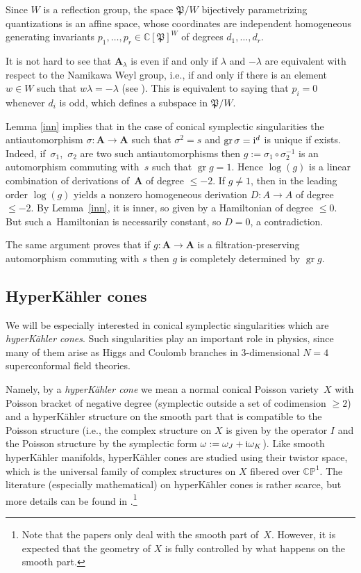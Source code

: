 \documentclass[pdftex]{sigma}
\numberwithin{equation}{section}
\begin{document}
Since $W$ is a reflection group, the space $\mathfrak{P}/W$ bijectively parametrizing quantizations is an affine space, whose coordinates are independent homogeneous generating invariants $p_1,\dots,p_r\in {\mathbb C}[\mathfrak{P}]^W$ of degrees $d_1,\dots,d_r$.

It is not hard to see that ${\mathbf A}_\lambda$ is even if and only if $\lambda$ and $-\lambda$ are equivalent with respect to the Namikawa Weyl group, i.e., if and only if there is an element $w\in W$ such that $w\lambda=-\lambda$ (see \cite{BPR}). This is equivalent to saying that $p_i=0$ whenever $d_i$ is odd, which defines a subspace in
$\mathfrak{P}/W$.

\begin{Remark}Lemma \ref{inn} implies that in the case of conical symplectic singularities the antiautomorphism $\sigma\colon {\mathbf A}\to {\mathbf A}$ such that $\sigma^2=s$ and $\operatorname{gr}\sigma={\rm i}^d$ is unique if exists. Indeed, if~$\sigma_1$,~$\sigma_2$ are two such antiautomorphisms then $g:=\sigma_1\circ \sigma_2^{-1}$ is an automorphism commuting with~$s$ such that $\operatorname{gr} g=1$. Hence $\log (g)$ is a linear combination of derivations of~${\mathbf A}$ of degree $\le -2$. If $g\ne 1$, then in the leading order $\log(g)$ yields a nonzero homogeneous derivation $D\colon A\to A$ of degree $\le -2$. By Lemma~\ref{inn}, it is inner, so given by a Hamiltonian of degree $\le 0$. But such a~Hamiltonian is necessarily constant, so $D=0$, a contradiction.

The same argument proves that if $g\colon {\mathbf A}\to {\mathbf A}$ is a filtration-preserving
automorphism commuting with $s$ then $g$ is completely determined by $\operatorname{gr}g$.
\end{Remark}

\subsection{HyperK\"ahler cones}

We will be especially interested in conical symplectic singularities which are {\it hyperK\"ahler cones}. Such singularities play an important role in physics, since many of them arise as Higgs and Coulomb branches in 3-dimensional $N=4$ superconformal field theories.

Namely, by a {\it hyperK\"ahler cone} we mean a normal conical Poisson variety~$X$ with Poisson bracket of negative degree (symplectic outside a set of codimension $\ge 2$) and a hyperK\"ahler structure on the smooth part that is compatible to the Poisson structure (i.e., the complex structure on $X$ is given by the operator $I$ and the Poisson structure by the symplectic form $\omega:=\omega_J+{\rm i}\omega_K$). Like smooth hyperK\"ahler manifolds, hyperK\"ahler cones are studied using their twistor space, which is the universal family of complex structures on $X$ fibered over ${\mathbb C}{\mathbb P}^1$. The literature (especially mathematical) on hyperK\"ahler cones is rather scarce, but more details can be found in \cite{Br, GNT,Sw}.\footnote{Note that the papers \cite{Br, Sw} only deal with the smooth part of~$X$. However, it is expected that the geometry of $X$ is fully controlled by what happens on the smooth part.}
\end{document}
